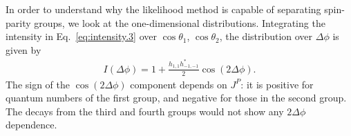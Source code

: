 \documentclass[prd,preprintnumbers,floatfix,
nofootinbib,superscriptaddress]{revtex4}
\newcommand{\diff}{\mathrm{d}}
\begin{document}
In order to understand why the likelihood method is capable of separating spin-parity groups,
we look at the one-dimensional distributions.
Integrating the intensity in Eq.~\eqref{eq:intensity.3} over $\cos\theta_1$, $\cos\theta_2$, the distribution over $\Delta\phi$ is given by
\begin{align}
  I(\Delta\phi) = 1 + \frac{h_{1,1} h_{-1,-1}^*}{2} \cos(2 \Delta\phi).
\end{align}
The sign of the $\cos(2\Delta\phi)$ component depends on $J^P$: it is positive for quantum numbers of the first group, and negative for those in the second group.
The decays from the third and fourth groups would not show any $2\Delta\phi$ dependence.
%

\end{document}
